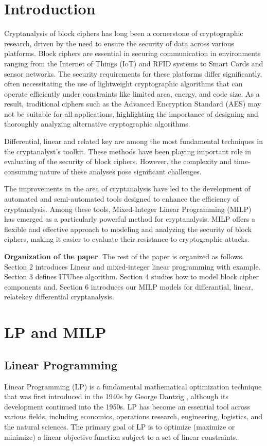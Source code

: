 \documentclass [version=final]{iacrcc}
\begin{document}
\section{Introduction}
Cryptanalysis of block ciphers has long been a cornerstone of cryptographic research, driven by the need to ensure the security of data across various platforms. Block ciphers are essential in securing communication in environments ranging from the Internet of Things (IoT) and RFID systems to Smart Cards and sensor networks. The security requirements for these platforms differ significantly, often necessitating the use of lightweight cryptographic algorithms that can operate efficiently under constraints like limited area, energy, and code size. As a result, traditional ciphers such as the Advanced Encryption Standard (AES) may not be suitable for all applications, highlighting the importance of designing and thoroughly analyzing alternative cryptographic algorithms. 

Differential, linear and related key are among the most fundamental techniques in the cryptanalyst's toolkit. These methods have been playing important role in evaluating of the security of block ciphers. However, the complexity and time-consuming nature of these analyses pose significant challenges. 

The improvements in the area of cryptanalysis have led to the development of automated and semi-automated tools designed to enhance the efficiency of cryptanalysis. Among these tools, Mixed-Integer Linear Programming (MILP) has emerged as a particularly powerful method for cryptanalysis. MILP offers a flexible and effective approach to modeling and analyzing the security of block ciphers, making it easier to evaluate their resistance to cryptographic attacks.



\textbf{Organization of the paper}. The rest of the paper is organized as follows. Section 2 introduces Linear and mixed-integer linear programming with example. Section 3 defines ITUbee algorithm. Section 4 studies how to model block cipher components and. Section 6 introduces our MILP models for differantial, linear, relatekey differential cryptanalysis.

\section{LP and MILP}

\subsection{Linear Programming}
Linear Programming (LP) is a fundamental mathematical optimization technique that was first introduced in the 1940s by George Dantzig \cite{dantzig2002linear}, although its development continued into the 1950s. LP has become an essential tool across various fields, including economics, operations research, engineering, logistics, and the natural sciences. The primary goal of LP is to optimize (maximize or minimize) a linear objective function subject to a set of linear constraints.
\end{document}
